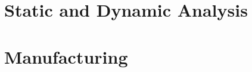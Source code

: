 \documentclass[12pt, fleqn]{report}
\begin{document}
\chapter{Static and Dynamic Analysis}\label{cha:analysis}


% 

\chapter{Manufacturing}\label{cha:manufacturing}


% 

% 

% 

% 

% 

\usechapterimagefalse
\appendix
\end{document}
